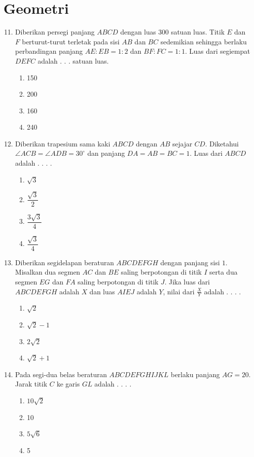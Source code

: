 \documentclass{article}
\begin{document}
\section*{Geometri}
\begin{enumerate}[label={Soal \arabic*}]
    \setcounter{enumi}{10}
    \item Diberikan persegi panjang $ABCD$ dengan luas $300$ satuan luas. Titik $E$ dan $F$ berturut-turut terletak pada sisi $AB$ dan $BC$ sedemikian sehingga berlaku perbandingan panjang $AE:EB=1:2$ dan $BF:FC=1:1$. Luas dari segiempat $DEFC$ adalah . . . satuan luas.
    \begin{enumerate}[label={(\Alph*)}]
        \item 150 \item 200 \item 160 \item 240
    \end{enumerate}

    \item Diberikan trapesium sama kaki $ABCD$ dengan $AB$ sejajar $CD$. Diketahui $\angle ACB=\angle ADB=30^\circ$ dan panjang $DA=AB=BC=1$. Luas dari $ABCD$ adalah . . . .
    \begin{enumerate}[label={(\Alph*)}]
        \item $\sqrt{3}$ \item $\dfrac{\sqrt{3}}{2}$ \item $\dfrac{3\sqrt{3}}{4}$ \item $\dfrac{\sqrt{3}}{4}$
    \end{enumerate}

    \item Diberikan segidelapan beraturan $ABCDEFGH$ dengan panjang sisi $1$. Misalkan dua segmen $AC$ dan $BE$ saling berpotongan di titik $I$ serta dua segmen $EG$ dan $FA$ saling berpotongan di titik $J$. Jika luas dari $ABCDEFGH$ adalah $X$ dan luas $AIEJ$ adalah $Y$, nilai dari $\frac{X}{Y}$ adalah . . . .
    \begin{enumerate}[label={(\Alph*)}]
        \item $\sqrt{2}$ \item $\sqrt{2}-1$ \item $2\sqrt{2}$ \item $\sqrt{2}+1$
    \end{enumerate}

    \item Pada segi-dua belas beraturan $ABCDEFGHIJKL$ berlaku panjang $AG=20$. Jarak titik $C$ ke garis $GL$ adalah . . . .
    \begin{enumerate}[label={(\Alph*)}]
        \item $10\sqrt{2}$ \item 10 \item $5\sqrt{6}$ \item 5
    \end{enumerate}


\end{enumerate}
\end{document}
